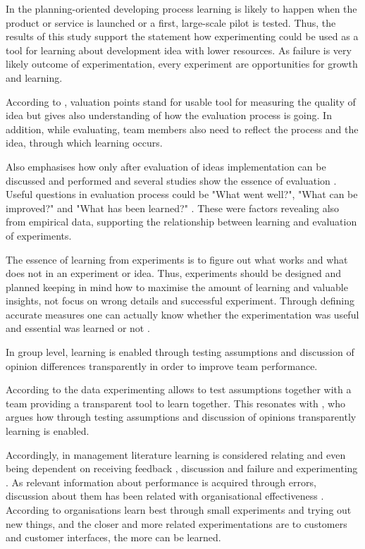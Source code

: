 In the planning-oriented developing process learning is likely to happen when the product or service is launched or a first, large-scale pilot is tested. Thus, the results of this study support the statement how experimenting could be used as a tool for learning about development idea with lower resources. As failure is very likely outcome of experimentation, every experiment are opportunities for growth and learning. 

According to \citet{buijs2007innovation}, valuation points stand for usable tool for measuring the quality of idea but gives also understanding of how the evaluation process is going. In addition, while evaluating, team members also need to reflect the process and the idea, through which learning occurs. 

Also \citep{runco1994problem} emphasises how only after evaluation of ideas implementation can be discussed and performed and several studies show the essence of evaluation \citep{mumford2002leading,vincent2002divergent}. Useful questions in evaluation process could be "What went well?", "What can be improved?" and "What has been learned?" \citep{buijs2007innovation}. These were factors revealing also from empirical data, supporting the relationship between learning and evaluation of experiments. 

The essence of learning from experiments is to figure out what works and what does not in an experiment or idea. Thus, experiments should be designed and planned keeping in mind how to maximise the amount of learning and valuable insights, not focus on wrong details and successful experiment. Through defining accurate measures one can actually know whether the experimentation was useful and essential was learned or not \citep{thomke2003r}. 

In group level, learning is enabled through testing assumptions and discussion of opinion differences transparently in order to improve team performance. \citep{edmondson1999psychological} 

According to the data experimenting allows to test assumptions together with a team providing a transparent tool to learn together. This resonates with \citet{edmondson1999psychological}, who argues how through testing assumptions and discussion of opinions transparently learning is enabled. 

Accordingly, in management literature learning is considered relating and even being dependent on receiving feedback \citep{schon1983reflective}, discussion and failure \citep{sitkin1992learning} and experimenting \citep{henderson1990architectural}. As relevant information about performance is acquired through errors, discussion about them has been related with organisational effectiveness \citep{sitkin1992learning}. According to \citet{huy2003rhythm} organisations learn best through small experiments and trying out new things, and the closer and more related experimentations are to customers and customer interfaces, the more can be learned. 

